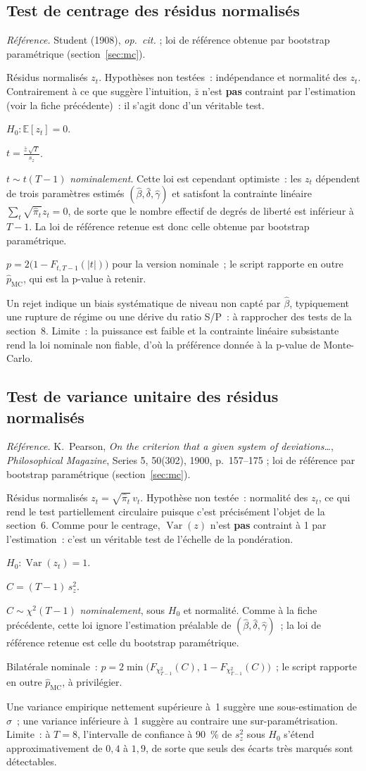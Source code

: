 \documentclass[a4paper,11pt]{article}
\newcommand{\refl}[1]{{\small\textcolor{maincolor!70!black}{\textit{Référence.} #1}}\par\smallskip}
\newcounter{ficheid}
\newenvironment{fiche}[1]{%
  \stepcounter{ficheid}%
  \phantomsection
  \subsection{#1}%
  \label{fiche:\theficheid}%
}{%
  \end{description}\vspace{0.5em}%
}
\newcommand{\Cadre}{%
  \begin{description}[leftmargin=0pt, style=unboxed, itemsep=3pt, topsep=3pt, parsep=2pt]%
  \item[\textcolor{financeblue}{\textbf{1. Cadre, notations et hypothèses de validité (non testées).}}]}
\newcommand{\Hzero}{\item[\textcolor{financeblue}{\textbf{2. Hypothèse nulle.}}]}
\newcommand{\Stat}{\item[\textcolor{financeblue}{\textbf{3. Statistique de test.}}]}
\newcommand{\Loi}{\item[\textcolor{financeblue}{\textbf{4. Loi sous $H_0$.}}]}
\newcommand{\Pval}{\item[\textcolor{financeblue}{\textbf{5. p-value.}}]}
\newcommand{\Usage}{\item[\textcolor{financeblue}{\textbf{6. Usage et limites.}}]}
\begin{document}
\begin{fiche}{Test de centrage des résidus normalisés}
\refl{Student (1908), \emph{op.\ cit.} ; loi de référence obtenue par bootstrap paramétrique
(section~\ref{sec:mc}).}
\Cadre
Résidus normalisés $z_t$. Hypothèses non testées~: indépendance et normalité des $z_t$.
Contrairement à ce que suggère l'intuition, $\bar z$ n'est \textbf{pas} contraint par
l'estimation (voir la fiche précédente)~: il s'agit donc d'un véritable test.
\Hzero
$H_0 : \mathbb{E}[z_t] = 0$.
\Stat
$\displaystyle t = \frac{\bar z\,\sqrt{T}}{s_z}$.
\Loi
$t \sim t(T-1)$ \emph{nominalement}. Cette loi est cependant optimiste~: les $z_t$ dépendent de
trois paramètres estimés $(\hat\beta,\hat\delta,\hat\gamma)$ et satisfont la contrainte linéaire
$\sum_t\sqrt{\hat\pi_t}z_t = 0$, de sorte que le nombre effectif de degrés de liberté est
inférieur à $T-1$. La loi de référence retenue est donc celle obtenue par bootstrap paramétrique.
\Pval
$p = 2\big(1 - F_{t,T-1}(|t|)\big)$ pour la version nominale~; le script rapporte en outre
$\hat p_{\text{MC}}$, qui est la p-value à retenir.
\Usage
Un rejet indique un biais systématique de niveau non capté par $\hat\beta$, typiquement une
rupture de régime ou une dérive du ratio S/P~: à rapprocher des tests de la section~8. Limite~:
la puissance est faible et la contrainte linéaire subsistante rend la loi nominale
non fiable, d'où la préférence donnée à la p-value de Monte-Carlo.
\end{fiche}

\begin{fiche}{Test de variance unitaire des résidus normalisés}
\refl{K.~Pearson, \emph{On the criterion that a given system of deviations\dots},
\emph{Philosophical Magazine}, Series 5, 50(302), 1900, p.~157--175 ; loi de référence par
bootstrap paramétrique (section~\ref{sec:mc}).}
\Cadre
Résidus normalisés $z_t = \sqrt{\hat\pi_t}\,v_t$. Hypothèse non testée~: normalité des $z_t$, ce
qui rend le test partiellement circulaire puisque c'est précisément l'objet de la section~6.
Comme pour le centrage, $\operatorname{Var}(z)$ n'est \textbf{pas} contraint à 1 par
l'estimation~: c'est un véritable test de l'échelle de la pondération.
\Hzero
$H_0 : \operatorname{Var}(z_t) = 1$.
\Stat
$\displaystyle C = (T-1)\,s_z^2$.
\Loi
$C \sim \chi^2(T-1)$ \emph{nominalement}, sous $H_0$ et normalité. Comme à la fiche précédente,
cette loi ignore l'estimation préalable de $(\hat\beta,\hat\delta,\hat\gamma)$~; la loi de
référence retenue est celle du bootstrap paramétrique.
\Pval
Bilatérale nominale~:
$p = 2\min\big(F_{\chi^2_{T-1}}(C),\, 1 - F_{\chi^2_{T-1}}(C)\big)$~; le script rapporte en outre
$\hat p_{\text{MC}}$, à privilégier.
\Usage
Une variance empirique nettement supérieure à~1 suggère une sous-estimation de $\sigma$~;
une variance inférieure à~1 suggère au contraire une sur-paramétrisation. Limite~: à $T = 8$,
l'intervalle de confiance à 90~\% de $s_z^2$ sous $H_0$ s'étend approximativement de $0{,}4$
à $1{,}9$, de sorte que seuls des écarts très marqués sont détectables.
\end{fiche}
\end{document}
